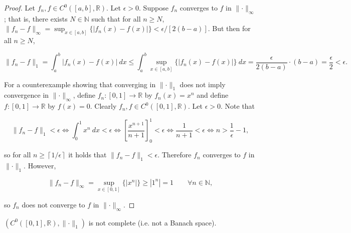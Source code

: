 \begin{proof}

Let \(f_n, f \in C^0([a,b], \mathbb{R})\). Let \(\epsilon > 0\). Suppose \(f_n\) converges to \(f\) in \(\lVert \cdot \rVert_\infty\); that is, there exists \(N \in \mathbb{N}\) such that for all \(n \geq N\), \(\lVert f_n - f \rVert_\infty = \sup_{x \in [a,b]} \{ | f_n(x) - f(x)| \} < \epsilon/[2(b-a)]\). But then for all \(n \geq N\),

\[
\lVert f_n - f \rVert_1 = \int_a^b |f_n(x) - f(x)| \ dx \leq  \int_a^b \sup_{x \in [a,b]} \{ | f_n(x) - f(x)| \} \ dx  = \frac{\epsilon}{2(b-a)} \cdot(b-a) =  \frac{\epsilon}{2} < \epsilon.
\]

For a counterexample showing that converging in \(\lVert \cdot \rVert_1\) does not imply convergence in \(\lVert \cdot \rVert_\infty\), define \(f_n: [0,1] \to \mathbb{R}\) by \(f_n(x) = x^n\) and define \(f: [0,1] \to \mathbb{R}\) by \(f(x) = 0\). Clearly \(f_n, f \in C^0([0,1], \mathbb{R})\). Let \(\epsilon > 0\). Note that 

\[
\lVert f_n - f \rVert_1 < \epsilon \iff  \int_0^1 x^n \ dx < \epsilon \iff \left[ \frac{x^{n+1}}{n+1} \right]_0^1 < \epsilon \iff \frac{1}{n+1} < \epsilon \iff n > \frac{1}{\epsilon} - 1,
\]

so for all \(n \geq \left\lceil  1/\epsilon \right\rceil\) it holds that \(\lVert f_n - f \rVert_1 < \epsilon\). Therefore \(f_n\) converges to \(f\) in \(\lVert \cdot \rVert_1\). However, 

\[
\lVert f_n - f \rVert_\infty =  \sup_{x \in [0,1]} \{ | x^n | \} \geq | 1^n | = 1 \qquad \forall n \in \mathbb{N}, 
\]

so \(f_n\) does not converge to \(f\) in \(\lVert \cdot \rVert_\infty\).



\end{proof}





\begin{proposition}

\((C^0([0,1], \mathbb{R}), \lVert \cdot \rVert_1)\) is not complete (i.e. not a Banach space).

\end{proposition}

